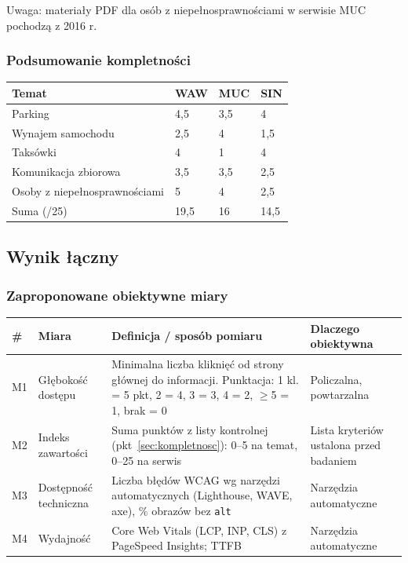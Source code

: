 \documentclass[11pt,a4paper]{article}
\begin{document}
Uwaga: materiały PDF dla osób z niepełnosprawnościami w serwisie MUC pochodzą z 2016 r.

\subsubsection*{Podsumowanie kompletności}

{\small
\begin{tabularx}{\textwidth}{@{}YC{2cm}C{2cm}C{2cm}@{}}
\toprule
Temat & WAW & MUC & SIN \\
\midrule
Parking & 4,5 & 3,5 & 4 \\
Wynajem samochodu & 2,5 & 4 & 1,5 \\
Taksówki & 4 & 1 & 4 \\
Komunikacja zbiorowa & 3,5 & 3,5 & 2,5 \\
Osoby z niepełnosprawnościami & 5 & 4 & 2,5 \\
\midrule
Suma (/25) & 19,5 & 16 & 14,5 \\
\bottomrule
\end{tabularx}
}

\subsection{Wynik łączny}

\subsubsection*{Zaproponowane obiektywne miary}

{\footnotesize
\begin{tabularx}{\textwidth}{@{}C{0.6cm}L{3.2cm}YL{3.4cm}@{}}
\toprule
\# & Miara & Definicja / sposób pomiaru & Dlaczego obiektywna \\
\midrule
M1 & Głębokość dostępu & Minimalna liczba kliknięć od strony głównej do informacji. Punktacja: 1 kl. = 5 pkt, 2 = 4, 3 = 3, 4 = 2, $\geq$5 = 1, brak = 0 & Policzalna, powtarzalna \\
M2 & Indeks zawartości & Suma punktów z listy kontrolnej (pkt~\ref{sec:kompletnosc}): 0--5 na temat, 0--25 na serwis & Lista kryteriów ustalona przed badaniem \\
M3 & Dostępność techniczna & Liczba błędów WCAG wg narzędzi automatycznych (Lighthouse, WAVE, axe), \% obrazów bez \texttt{alt} & Narzędzia automatyczne \\
M4 & Wydajność & Core Web Vitals (LCP, INP, CLS) z PageSpeed Insights; TTFB & Narzędzia automatyczne \\
\bottomrule
\end{tabularx}
}
\end{document}
